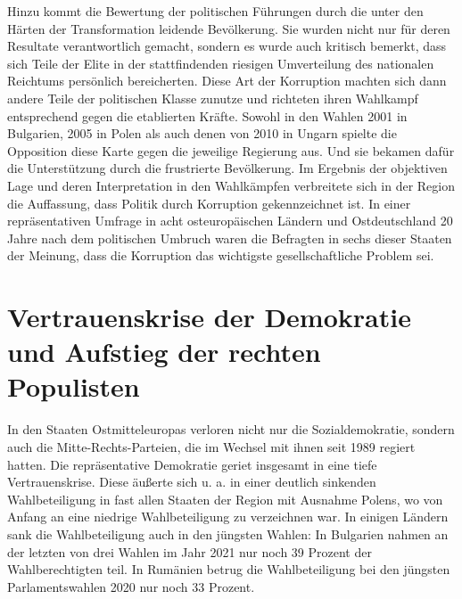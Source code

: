 \begin{multicols*}{2}
    \noindent Hinzu kommt die Bewertung der politischen Führungen durch die unter den Härten der Transformation leidende Bevölkerung. Sie wurden nicht nur für deren Resultate verantwortlich gemacht, sondern es wurde auch kritisch bemerkt, dass sich Teile der Elite in der stattfindenden riesigen Umverteilung des nationalen Reichtums persönlich bereicherten. Diese Art der Korruption machten sich dann andere Teile der politischen Klasse zunutze und richteten ihren Wahlkampf entsprechend gegen die etablierten Kräfte. Sowohl in den Wahlen 2001 in Bulgarien, 2005 in Polen als auch denen von 2010 in Ungarn spielte die Opposition diese Karte gegen die jeweilige Regierung aus. Und sie bekamen dafür die Unterstützung durch die frustrierte Bevölkerung. Im Ergebnis der objektiven Lage und deren Interpretation in den Wahlkämpfen verbreitete sich in der Region die Auffassung, dass Politik durch Korruption gekennzeichnet ist. In einer repräsentativen Umfrage in acht osteuropäischen Ländern und Ostdeutschland 20 Jahre nach dem politischen Umbruch waren die Befragten in sechs dieser Staaten der Meinung, dass die Korruption das wichtigste gesellschaftliche Problem sei. 

    \section{Vertrauenskrise der Demokratie und Aufstieg der rechten Populisten}
    \noindent In den Staaten Ostmitteleuropas verloren nicht nur die Sozialdemokratie, sondern auch die Mitte-Rechts-Parteien, die im Wechsel mit ihnen seit 1989 regiert hatten. Die repräsentative Demokratie geriet insgesamt in eine tiefe Vertrauenskrise. Diese äußerte sich u. a. in einer deutlich sinkenden Wahlbeteiligung in fast allen Staaten der Region mit Ausnahme Polens, wo von Anfang an eine niedrige Wahlbeteiligung zu verzeichnen war. In einigen Ländern sank die Wahlbeteiligung auch in den jüngsten Wahlen: In Bulgarien nahmen an der letzten von drei Wahlen im Jahr 2021 nur noch 39 Prozent der Wahlberechtigten teil. In Rumänien betrug die Wahlbeteiligung bei den jüngsten Parlamentswahlen 2020 nur noch 33 Prozent.


\end{multicols*}
